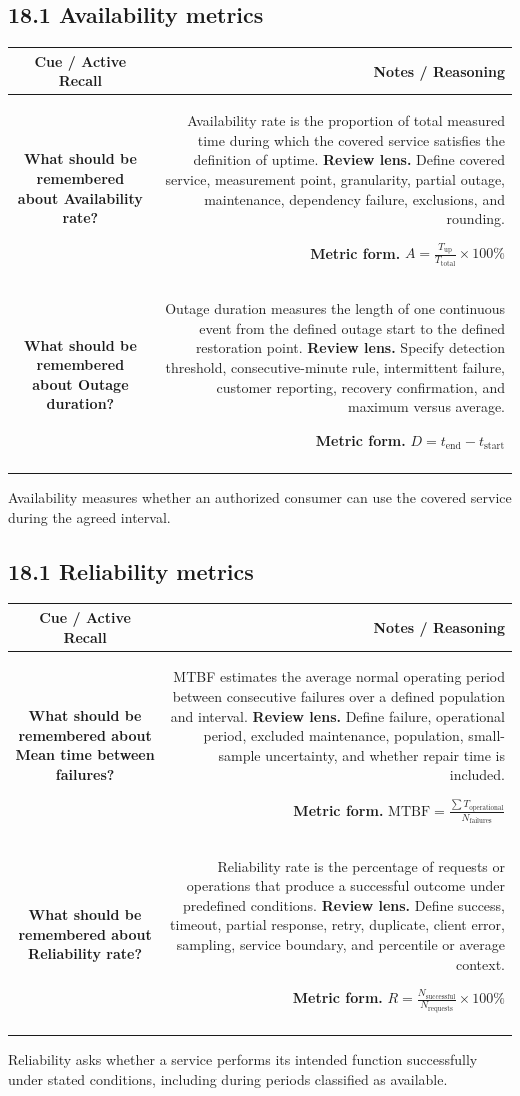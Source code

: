 \documentclass[11pt]{article}
\newcommand{\CornellHeader}{\rowcolor{Navy}\color{white}\bfseries Cue / Active Recall & \color{white}\bfseries Notes / Reasoning \\\endhead}
\newcommand{\CornellRow}[2]{\cellcolor{CueGray}\textbf{#1} & #2 \\\addlinespace[3pt]}
\begin{document}
\subsection{18.1 Availability metrics}
\begin{longtable}{@{}C N@{}}
\CornellHeader
\CornellRow{What should be remembered about Availability rate?}{Availability rate is the proportion of total measured time during which the covered service satisfies the definition of uptime. \textbf{Review lens.} Define covered service, measurement point, granularity, partial outage, maintenance, dependency failure, exclusions, and rounding.\par\smallskip\textbf{Metric form.} \(\displaystyle A=\frac{T_{\mathrm{up}}}{T_{\mathrm{total}}}\times100\%\)}
\CornellRow{What should be remembered about Outage duration?}{Outage duration measures the length of one continuous event from the defined outage start to the defined restoration point. \textbf{Review lens.} Specify detection threshold, consecutive-minute rule, intermittent failure, customer reporting, recovery confirmation, and maximum versus average.\par\smallskip\textbf{Metric form.} \(\displaystyle D=t_{\mathrm{end}}-t_{\mathrm{start}}\)}
\end{longtable}
\begin{sectionsummarybox}
Availability measures whether an authorized consumer can use the covered service during the agreed interval.
\end{sectionsummarybox}
\subsection{18.1 Reliability metrics}
\begin{longtable}{@{}C N@{}}
\CornellHeader
\CornellRow{What should be remembered about Mean time between failures?}{MTBF estimates the average normal operating period between consecutive failures over a defined population and interval. \textbf{Review lens.} Define failure, operational period, excluded maintenance, population, small-sample uncertainty, and whether repair time is included.\par\smallskip\textbf{Metric form.} \(\displaystyle \mathrm{MTBF}=\frac{\sum T_{\mathrm{operational}}}{N_{\mathrm{failures}}}\)}
\CornellRow{What should be remembered about Reliability rate?}{Reliability rate is the percentage of requests or operations that produce a successful outcome under predefined conditions. \textbf{Review lens.} Define success, timeout, partial response, retry, duplicate, client error, sampling, service boundary, and percentile or average context.\par\smallskip\textbf{Metric form.} \(\displaystyle R=\frac{N_{\mathrm{successful}}}{N_{\mathrm{requests}}}\times100\%\)}
\end{longtable}
\begin{sectionsummarybox}
Reliability asks whether a service performs its intended function successfully under stated conditions, including during periods classified as available.
\end{sectionsummarybox}
\end{document}
